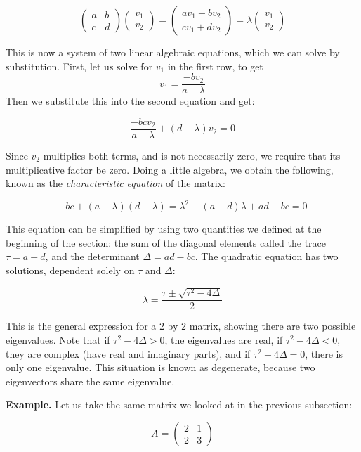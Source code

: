 \documentclass[
  letterpaper,
  DIV=11,
  numbers=noendperiod]{scrreprt}
\begin{document}
\[
\left(\begin{array}{cc}a & b \\c & d\end{array}\right)\left(\begin{array}{c}v_1 \\ v_2 \end{array}\right) = \left(\begin{array}{c}av_1 +b v_2\\ cv_1+ dv_2 \end{array}\right) = \lambda \left(\begin{array}{c}v_1 \\ v_2 \end{array}\right)
\]

This is now a system of two linear algebraic equations, which we can
solve by substitution. First, let us solve for \(v_1\) in the first row,
to get \[v_1 = \frac{-bv_2}{a-\lambda}\] Then we substitute this into
the second equation and get:

\[
\frac{-bcv_2}{a-\lambda} +(d-\lambda)v_2 = 0
\]

Since \(v_2\) multiplies both terms, and is not necessarily zero, we
require that its multiplicative factor be zero. Doing a little algebra,
we obtain the following, known as the \emph{characteristic equation} of
the matrix:

\[
-bc +(a-\lambda)(d-\lambda) = \lambda^2-(a+d)\lambda +ad-bc = 0
\]

This equation can be simplified by using two quantities we defined at
the beginning of the section: the sum of the diagonal elements called
the trace \(\tau = a+d\), and the determinant \(\Delta = ad-bc\). The
quadratic equation has two solutions, dependent solely on \(\tau\) and
\(\Delta\):

\[
\lambda = \frac{\tau \pm \sqrt{\tau^2-4\Delta}}{2}
\]

This is the general expression for a 2 by 2 matrix, showing there are
two possible eigenvalues. Note that if \(\tau^2-4\Delta>0\), the
eigenvalues are real, if \(\tau^2-4\Delta<0\), they are complex (have
real and imaginary parts), and if \(\tau^2-4\Delta=0\), there is only
one eigenvalue. This situation is known as degenerate, because two
eigenvectors share the same eigenvalue.

\textbf{Example.} Let us take the same matrix we looked at in the
previous subsection:

\[
A = \left(\begin{array}{cc}2 & 1 \\ 2& 3\end{array}\right)
\]
\end{document}
